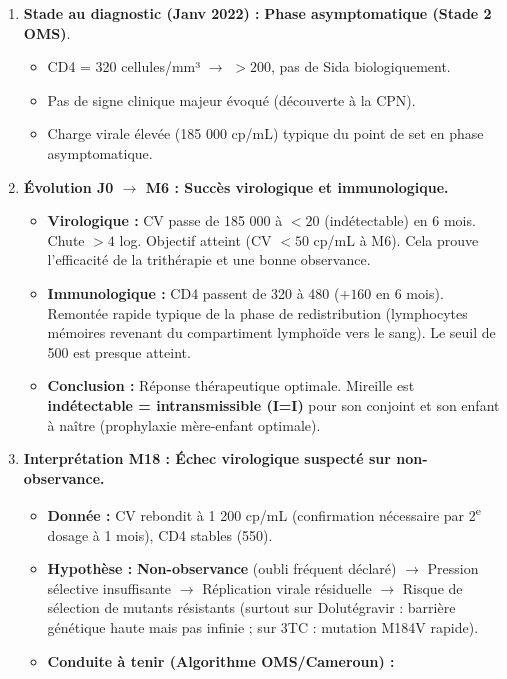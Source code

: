 \documentclass[11pt]{article}
\begin{document}
\begin{exoresolu}
\begin{enumerate}
    \item \textbf{Stade au diagnostic (Janv 2022) :} \textbf{Phase asymptomatique (Stade 2 OMS)}.
        \begin{itemize}
            \item CD4 = 320 cellules/mm³ $\rightarrow$ $> 200$, pas de Sida biologiquement.
            \item Pas de signe clinique majeur évoqué (découverte à la CPN).
            \item Charge virale élevée (185 000 cp/mL) typique du point de set en phase asymptomatique.
        \end{itemize}
    \item \textbf{Évolution J0 $\rightarrow$ M6 : Succès virologique et immunologique.}
        \begin{itemize}
            \item \textbf{Virologique :} CV passe de 185 000 à $< 20$ (indétectable) en 6 mois. Chute $> 4$ log. Objectif atteint (CV $< 50$ cp/mL à M6). Cela prouve l'efficacité de la trithérapie et une bonne observance.
            \item \textbf{Immunologique :} CD4 passent de 320 à 480 ($+160$ en 6 mois). Remontée rapide typique de la phase de redistribution (lymphocytes mémoires revenant du compartiment lymphoïde vers le sang). Le seuil de 500 est presque atteint.
            \item \textbf{Conclusion :} Réponse thérapeutique optimale. Mireille est \textbf{indétectable = intransmissible (I=I)} pour son conjoint et son enfant à naître (prophylaxie mère-enfant optimale).
        \end{itemize}
    \item \textbf{Interprétation M18 : Échec virologique suspecté sur non-observance.}
        \begin{itemize}
            \item \textbf{Donnée :} CV rebondit à 1 200 cp/mL (confirmation nécessaire par 2\textsuperscript{e} dosage à 1 mois), CD4 stables (550).
            \item \textbf{Hypothèse :} \textbf{Non-observance} (oubli fréquent déclaré) $\rightarrow$ Pression sélective insuffisante $\rightarrow$ Réplication virale résiduelle $\rightarrow$ Risque de sélection de mutants résistants (surtout sur Dolutégravir : barrière génétique haute mais pas infinie ; sur 3TC : mutation M184V rapide).
            \item \textbf{Conduite à tenir (Algorithme OMS/Cameroun) :}

\end{itemize}
\end{enumerate}
\end{exoresolu}
\end{document}
